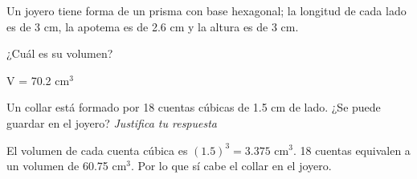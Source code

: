 Un joyero tiene forma de un prisma con base hexagonal; la longitud de cada lado
es de 3 cm, la apotema es de 2.6 cm y la altura es de 3 cm.

\begin{parts}
    ¿Cuál es su volumen?

    \begin{solutionbox}{1.2cm}
        V = 70.2 cm$^3$
    \end{solutionbox}

    Un collar está formado por 18 cuentas cúbicas de 1.5 cm de lado. ¿Se puede
    guardar en el joyero? \emph{Justifica tu respuesta}

    \begin{solutionbox}{1.7cm}
        El volumen de cada cuenta cúbica es $(1.5)^3 = 3.375 \text{ cm}^3$. 18 cuentas
        equivalen a un volumen de 60.75 cm$^3$. Por lo que sí cabe el collar en el joyero.
    \end{solutionbox}
\end{parts}